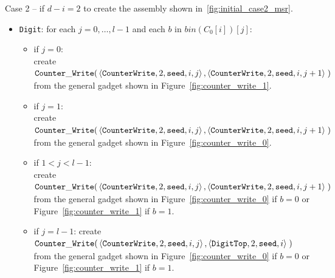 Case 2 -- if $d - i = 2$ to create the assembly shown in~\ref{fig:initial_case2_msr}.
\begin{itemize}
    \item {\tt Digit}: for each $j=0,\ldots,l-1$ and each $b$ in $bin(C_0[i])[j]$:
    \begin{itemize}
        \item if $j = 0$:\\ create
        $\begin{aligned}[t]
            {\tt Counter\_Write}(&\left\langle {\tt CounterWrite}, 2, {\tt seed}, i, j \right\rangle, \left\langle {\tt CounterWrite}, 2, {\tt seed}, i, j + 1 \right\rangle \;)
        \end{aligned}$\\from the general gadget shown in Figure~\ref{fig:counter_write_1}.

        \item if $j = 1$:\\ create
        $\begin{aligned}[t]
            {\tt Counter\_Write}(&\left\langle {\tt CounterWrite}, 2, {\tt seed}, i, j \right\rangle, \left\langle {\tt CounterWrite}, 2, {\tt seed}, i, j + 1 \right\rangle \;)
        \end{aligned}$\\from the general gadget shown in Figure~\ref{fig:counter_write_0}.

        \item if $1 < j < l-1$:\\ create
        $\begin{aligned}[t]
            {\tt Counter\_Write}(&\left\langle {\tt CounterWrite}, 2, {\tt seed}, i, j \right\rangle, \left\langle {\tt CounterWrite}, 2, {\tt seed}, i, j + 1 \right\rangle \;)
        \end{aligned}$\\from the general gadget shown in Figure~\ref{fig:counter_write_0} if $b = 0$ or Figure~\ref{fig:counter_write_1} if $b = 1$.

        \item if $j = l-1$: create
        $\begin{aligned}[t]
            {\tt Counter\_Write}(&\left\langle {\tt CounterWrite}, 2, {\tt seed}, i, j \right\rangle, \left\langle {\tt DigitTop}, 2, {\tt seed}, i \right\rangle \;)
        \end{aligned}$\\from the general gadget shown in Figure~\ref{fig:counter_write_0} if $b = 0$ or Figure~\ref{fig:counter_write_1} if $b = 1$.
    \end{itemize}


\end{itemize}
